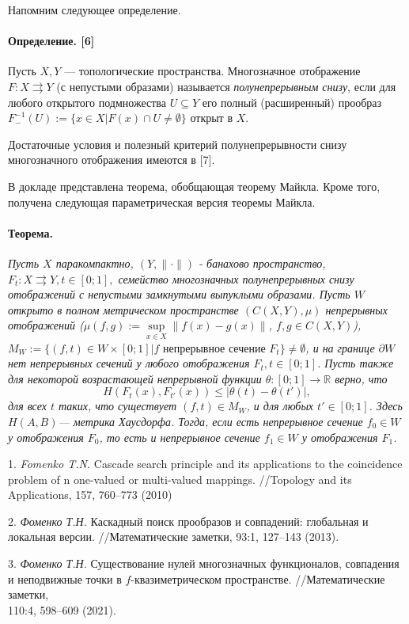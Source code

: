 Напомним следующее определение.

\paragraph{Определение. [6]} Пусть $X,Y$ --- топологические пространства. Многозначное отображение $F: X\rightrightarrows Y$ (с непустыми образами) называется {\it полунепрерывным снизу}, если для любого открытого подмножества  $U\subseteq Y$ его полный (расширенный) прообраз $F^{-1}_{-}(U):=\{x\in X | F(x)\cap U\ne \emptyset\}$ открыт в $X$.

Достаточные условия и полезный критерий полунепрерывности снизу многозначного отображения имеются в  [7].

В докладе представлена теорема, обобщающая теорему Майкла. Кроме того, получена следующая параметрическая версия теоремы Майкла.

\paragraph{Теорема.}
{\it Пусть $X$ паракомпактно, $(Y,\|\cdot \|)$ - банахово пространство, $F_{t}: X\rightrightarrows Y, t\in [0;1],$ семейство многозначных полунепрерывных снизу отображений с непустыми замкнутыми выпуклыми образами. Пусть $W$  открыто в полном метрическом пространстве $(C(X,Y),\mu)$ непрерывных отображений ($\mu(f,g):=\mathop{\sup}\limits_{x\in X}\|f(x)-g(x)\|$, $f,g\in C(X,Y)$), $M_{W}:=\{(f,t)\in W\times [0;1] | f \mbox{ непрерывное сечение } F_{t}\}\ne \emptyset$, и на границе $\partial W$ нет непрерывных сечений у любого отображения $F_{t}, t\in [0;1]$. Пусть также для некоторой возрастающей непрерывной функции $\theta: [0;1]\to \mathbb R$ верно, что
$$
H(F_{t}(x),F_{t'}(x))\le|\theta(t)-\theta(t')|,
$$
для всех $t$ таких, что существует $(f,t)\in M_{W}$, и для любых $t'\in [0;1]$. Здесь $H(A,B)$--- метрика Хаусдорфа. Тогда, если есть непрерывное сечение $f_{0}\in W$ у отображения $F_{0}$, то есть и непрерывное сечение $f_{1}\in W$ у отображения $F_{1}$.}

1.
{\it Fomenko T.N.} Cascade search principle and its applica\-ti\-ons to the
coincidence problem of n one-valued or multi-valued mappings. //Topology and its Applications, 157, 760--773 (2010)

2.
{\it Фоменко Т.Н.} Каскадный поиск прообразов и совпадений: глобальная и
локальная версии. //Математические заметки,  93:1, 127--143 (2013).

3.
{\it Фоменко Т.Н.} Существование нулей многозначных фу\-нкционалов, совпадения и неподвижные точки в $f$-ква\-зи\-мет\-ри\-чес\-ком пространстве. //Математические заметки, \\110:4, 598--609 (2021).

